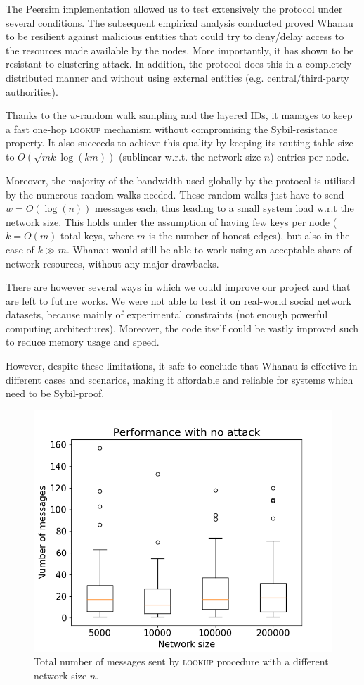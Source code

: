The Peersim implementation allowed us to test extensively the protocol under several conditions. The subsequent empirical analysis conducted proved Whanau to be resilient against malicious entities that could try to deny/delay access to the resources made available by the nodes. More importantly, it has shown to be resistant to clustering attack. In addition, the protocol does this in a completely distributed manner and without using external entities (e.g. central/third-party authorities). 

Thanks to the $w$-random walk sampling and the layered IDs, it manages to keep a fast one-hop \textsc{lookup} mechanism without compromising the Sybil-resistance property. It also succeeds to achieve this quality by keeping its routing table size to $O(\sqrt{mk}\log(km))$ (sublinear w.r.t. the network size $n$) entries per node.

Moreover, the majority of the bandwidth used globally by the protocol is utilised by the numerous random walks needed. These random walks just have to send $w=O(\log(n))$ messages each, thus leading to a small system load w.r.t the network size. This holds under the assumption of having few keys per node ($k=O(m)$ total keys, where $m$ is the number of honest edges), but also in the case of $k \gg m$.  Whanau would still be able to work using an acceptable share of network resources, without any major drawbacks.

There are however several ways in which we could improve our project and that are left to future works. We were not able to test it on real-world social network datasets, because mainly of experimental constraints (not enough powerful computing architectures). Moreover, the code itself could be vastly improved such to reduce memory usage and speed.

However, despite these limitations, it safe to conclude that Whanau is effective in different cases and scenarios, making it affordable and reliable for systems which need to be Sybil-proof.

\begin{figure}[t!]
    \centering
    \includegraphics[scale=0.4]{exp3.png}
    \caption{Total number of messages sent by \textsc{lookup} procedure with a different network size $n$.}
    \label{fig:experiment_3}
\end{figure}